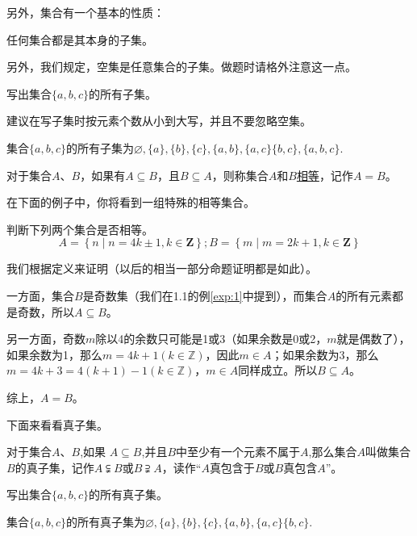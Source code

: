 \documentclass[lang=cn,math=cm,chinesefont=nofont,11pt,scheme=chinese,twocol]{elegantbook}
\begin{document}
  另外，集合有一个基本的性质：
\begin{property}
  任何集合都是其本身的子集。
\end{property}

另外，我们规定，空集是任意集合的子集。做题时请格外注意这一点。

\begin{example}
  写出集合$\{a,b,c\}$的所有子集。
\end{example}
\begin{remark}
  建议在写子集时按元素个数从小到大写，并且不要忽略空集。
\end{remark}
\begin{solution}
  集合$\{a,b,c\}$的所有子集为$\varnothing ,\{a\},\{b\},\{c\},\{a,b\},\{a,c\}\{b,c\},\{a,b,c\}$.
\end{solution}
\begin{definition}[集合的相等]
  对于集合$A$、$B$，如果有$A\subseteq B$，且$B\subseteq A$，则称集合$A$和$B$\underline{相等}，记作$A=B$。
\end{definition}

在下面的例子中，你将看到一组特殊的相等集合。

\begin{example}\label{exp:2}
  判断下列两个集合是否相等。
  $$A=\left\{n\mid n=4k\pm1,k\in\mathbf{Z}\right\};B=\left\{m\mid m=2k+1,k\in\mathbf{Z}\right\}$$
\end{example}
\begin{solution}
  我们根据定义来证明（以后的相当一部分命题证明都是如此）。

一方面，集合$B$是奇数集（我们在1.1的例\ref{exp:1}中提到），而集合$A$的所有元素都是奇数，所以$A\subseteq B$。

另一方面，奇数$m$除以4的余数只可能是1或3（如果余数是0或2，$m$就是偶数了），如果余数为1，那么$m=4k+1(k\in\mathbb{Z})$，因此$m\in A$；如果余数为3，那么$m=4k+3=4(k+1)-1(k\in\mathbb{Z})$，$m\in A$同样成立。所以$B\subseteq A$。

综上，$A=B$。
\end{solution}

下面来看看真子集。
\begin{definition}[真子集]
  对于集合$A$、$B$,如果 $A\subseteq B$,并且$B$中至少有一个元素不属于$A$,那么集合$A$叫做集合$B$的真子集，记作$A\subsetneqq B$或$B\supsetneqq A$，读作“$A$真包含于$B$或$B$真包含$A$”。
\end{definition}

\begin{example}
  写出集合$\{a,b,c\}$的所有真子集。
\end{example}
\begin{solution}集合$\{a,b,c\}$的所有真子集为$\varnothing ,\{a\},\{b\},\{c\},\{a,b\},\{a,c\}\{b,c\}$.
\end{solution}
\end{document}
